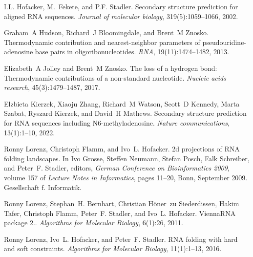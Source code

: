 \begin{DoxyDescription}
\item[\label{citelist_CITEREF_hofacker:2002}%
\Hypertarget{citelist_CITEREF_hofacker:2002}%
\mbox{[}15\mbox{]}]I.\+L. Hofacker, M.~Fekete, and P.\+F. Stadler. Secondary structure prediction for aligned RNA sequences. {\itshape Journal of molecular biology}, 319(5)\+:1059--1066, 2002.


\item[\label{citelist_CITEREF_hudson:2013}%
\Hypertarget{citelist_CITEREF_hudson:2013}%
\mbox{[}16\mbox{]}]Graham~A Hudson, Richard~J Bloomingdale, and Brent~M Znosko. Thermodynamic contribution and nearest-\/neighbor parameters of pseudouridine-\/adenosine base pairs in oligoribonucleotides. {\itshape RNA}, 19(11)\+:1474--1482, 2013. 


\item[\label{citelist_CITEREF_jolley:2017}%
\Hypertarget{citelist_CITEREF_jolley:2017}%
\mbox{[}17\mbox{]}]Elizabeth~A Jolley and Brent~M Znosko. The loss of a hydrogen bond\+: Thermodynamic contributions of a non-\/standard nucleotide. {\itshape Nucleic acids research}, 45(3)\+:1479--1487, 2017. 


\item[\label{citelist_CITEREF_kierzek:2022}%
\Hypertarget{citelist_CITEREF_kierzek:2022}%
\mbox{[}18\mbox{]}]Elzbieta Kierzek, Xiaoju Zhang, Richard~M Watson, Scott~D Kennedy, Marta Szabat, Ryszard Kierzek, and David~H Mathews. Secondary structure prediction for RNA sequences including N6-\/methyladenosine. {\itshape Nature communications}, 13(1)\+:1--10, 2022. 


\item[\label{citelist_CITEREF_lorenz:2009}%
\Hypertarget{citelist_CITEREF_lorenz:2009}%
\mbox{[}19\mbox{]}]Ronny Lorenz, Christoph Flamm, and Ivo~L. Hofacker. 2d projections of RNA folding landscapes. In Ivo Grosse, Steffen Neumann, Stefan Posch, Falk Schreiber, and Peter~F. Stadler, editors, {\itshape German Conference on Bioinformatics 2009}, volume 157 of {\itshape Lecture Notes in Informatics}, pages 11--20, Bonn, September 2009. Gesellschaft f. Informatik.


\item[\label{citelist_CITEREF_lorenz:2011}%
\Hypertarget{citelist_CITEREF_lorenz:2011}%
\mbox{[}20\mbox{]}]Ronny Lorenz, Stephan~H. Bernhart, Christian H\"{o}ner~zu Siederdissen, Hakim Tafer, Christoph Flamm, Peter~F. Stadler, and Ivo~L. Hofacker. Vienna\+RNA package 2.. {\itshape Algorithms for Molecular Biology}, 6(1)\+:26, 2011. 


\item[\label{citelist_CITEREF_lorenz:2016b}%
\Hypertarget{citelist_CITEREF_lorenz:2016b}%
\mbox{[}21\mbox{]}]Ronny Lorenz, Ivo~L. Hofacker, and Peter~F. Stadler. RNA folding with hard and soft constraints. {\itshape Algorithms for Molecular Biology}, 11(1)\+:1--13, 2016. 



\end{DoxyDescription}
